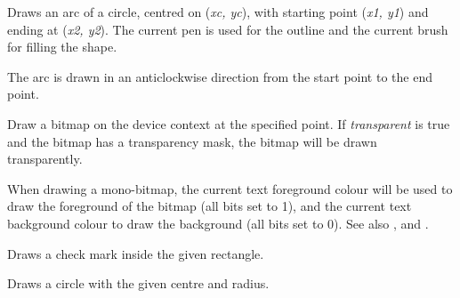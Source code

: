 \label{wxdcdrawarc}


Draws an arc of a circle, centred on ({\it xc, yc}), with starting point ({\it x1, y1})
and ending at ({\it x2, y2}).   The current pen is used for the outline
and the current brush for filling the shape.

The arc is drawn in an anticlockwise direction from the start point to the end point.

\label{wxdcdrawbitmap}


Draw a bitmap on the device context at the specified point. If {\it transparent} is true and the bitmap has
a transparency mask, the bitmap will be drawn transparently.

When drawing a mono-bitmap, the current text foreground colour will be used to draw the foreground
of the bitmap (all bits set to 1), and the current text background colour to draw the background
(all bits set to 0). See also , 
 and .

\label{wxdcdrawcheckmark}



Draws a check mark inside the given rectangle.

\label{wxdcdrawcircle}



Draws a circle with the given centre and radius.



